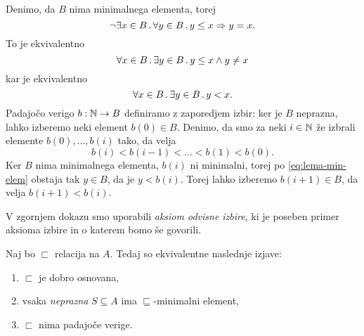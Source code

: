 \begin{dokaz}
  Denimo, da $B$ nima minimalnega elementa, torej
  \begin{equation*}
    \lnot \exists x \in B \,.\, \forall y \in B \,.\, y \leq x \Rightarrow y = x.
  \end{equation*}
  To je ekvivalentno
  \begin{equation*}
    \forall x \in B \,.\, \exists y \in B \,.\, y \leq x \land y \neq x
  \end{equation*}
  kar je ekvivalentno
  \begin{equation}
    \label{eq:lema-min-elem}
    \forall x \in B \,.\, \exists y \in B \,.\, y < x.
  \end{equation}
  Padajočo verigo $b : \mathbb{N} \to B$ definiramo z zaporedjem izbir: ker je $B$ neprazna, lahko izberemo
  neki element $b(0) \in B$. Denimo, da smo za neki $i \in \mathbb{N}$ že izbrali elemente $b(0), \ldots, b(i)$
  tako, da velja
  \begin{equation*}
    b(i) < b(i-1) < \ldots < b(1) < b(0).
  \end{equation*}
  Ker $B$ nima minimalnega elementa, $b(i)$ ni minimalni, torej po \eqref{eq:lema-min-elem} obstaja tak $y \in B$, da je $y < b(i)$. Torej lahko izberemo $b(i+1) \in B$, da velja $b(i+1) < b(i)$.
\end{dokaz}

\begin{opomba}
  V zgornjem dokazu smo uporabili \emph{aksiom odvisne izbire}, ki je poseben primer
  aksioma izbire in o katerem bomo še govorili.
\end{opomba}

\begin{izrek}
  \label{izr:dobr-osn-iff}
  Naj bo $\sqsubset$ relacija na $A$. Tedaj so ekvivalentne naslednje izjave:
  \begin{enumerate}
  \item \label{it:dobr-osn-1}%
    $\sqsubset$ je dobro osnovana,
  \item \label{it:dobr-osn-2}%
    vsaka \emph{neprazna} $S \subseteq A$ ima $\sqsubseteq$-minimalni element,
  \item \label{it:dobr-osn-3}%
    $\sqsubset$ nima padajoče verige.
  \end{enumerate}
\end{izrek}

